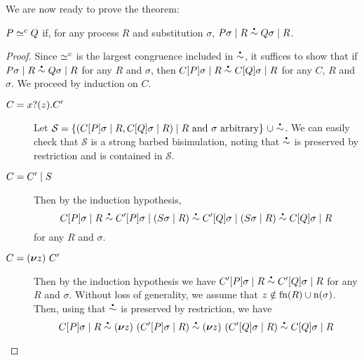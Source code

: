 We are now ready to prove the theorem:
\begin{theorem}
  \( P \simeq^c Q \) if, for any process \( R \) and
  substitution \( \sigma \),
  \(
  \sbbisim{\Ppar{\applysubst{\sigma}{P}}{R}}{\Ppar{\applysubst{\sigma}{Q}}{R}}
  \).
\end{theorem}
\begin{proof}
  Since \( \simeq^c \) is the largest congruence included in \( \sbbisim{}{} \), it suffices to show that if \( \sbbisim{\Ppar{\applysubst{\sigma}{P}}{R}}{\Ppar{\applysubst{\sigma}{Q}}{R}} \) for any \( R \) and \( \sigma \), then \( \sbbisim{\Ppar{\applysubst{\sigma}{\applyctx{C}{P}}}{R}}{\Ppar{\applysubst{\sigma}{\applyctx{C}{Q}}}{R}} \) for any \( C \), \( R \) and \( \sigma \).
  We proceed by induction on \( C \).
  \begin{description}
  \item[\( C = x ? (z) . C' \)] Let \( \mathcal{S} = \{ (\Ppar{\applysubst{\sigma}{\applyctx{C}{P}}}{R}, \Ppar{\applysubst{\sigma}{\applyctx{C}{Q}}}{R}) \mid \text{$R$ and $\sigma$ arbitrary} \}~\cup \sbbisim{}{} \).
    We can easily check that \( \mathcal{S} \) is a strong barbed bisimulation, noting that \( \sbbisim{}{} \) is preserved by restriction and is contained in \( \mathcal{S} \).
  \item[\( C = C' \mid S \)] Then by the induction hypothesis,
    \begin{equation*}
      \sbbisim{\sbbisim{\Ppar{\applysubst{\sigma}{\applyctx{C}{P}}}{R}}{\Ppar{\applysubst{\sigma}{\applyctx{C'}{P}}}{(\Ppar{\applysubst{\sigma}{S}}{R})}}}{\sbbisim{\Ppar{\applysubst{\sigma}{\applyctx{C'}{Q}}}{(\Ppar{\applysubst{\sigma}{S}}{R})}}{\Ppar{\applysubst{\sigma}{\applyctx{C}{Q}}}{R}}}
    \end{equation*}
    for any \( R \) and \( \sigma \).
  \item[\( C = (\bm{\nu} z)~C' \)] Then by the induction hypothesis we have \( \sbbisim{\Ppar{\applysubst{\sigma}{\applyctx{C'}{P}}}{R}}{\Ppar{\applysubst{\sigma}{\applyctx{C'}{Q}}}{R}} \) for any \( R \) and \( \sigma \).
    Without loss of generality, we assume that \( z \notin \textrm{fn}(R) \cup \textrm{n}(\sigma) \).
    Then, using that \( \sbbisim{}{} \) is preserved by restriction, we have
    \begin{equation*}
      \sbbisim{\sbbisim{\Ppar{\applysubst{\sigma}{\applyctx{C}{P}}}{R}}{\Pres{z}{(\Ppar{\applysubst{\sigma}{\applyctx{C'}{P}}}{R})}}}{\sbbisim{\Pres{z}{(\Ppar{\applysubst{\sigma}{\applyctx{C'}{Q}}}{R})}}{\Ppar{\applysubst{\sigma}{\applyctx{C}{Q}}}{R}}}

\end{equation*}
\end{description}
\end{proof}
